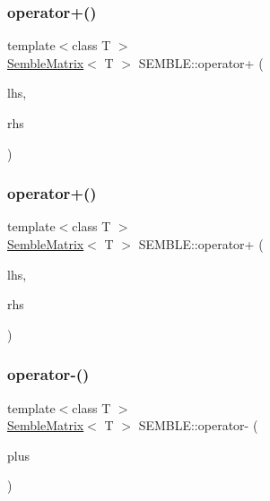 \mbox{\label{namespaceSEMBLE_a05f06146faa9f8202e65c4b5ea54b008}} 
\subsubsection{\texorpdfstring{operator+()}{operator+()}\hspace{0.1cm}{\footnotesize\ttfamily [5/6]}}
{\footnotesize\ttfamily template$<$class T $>$ \\
\mbox{\hyperlink{structSEMBLE_1_1SembleMatrix}{Semble\+Matrix}}$<$ T $>$ S\+E\+M\+B\+L\+E\+::operator+ (\begin{DoxyParamCaption}\item[{const \mbox{\hyperlink{structSEMBLE_1_1SembleMatrix}{Semble\+Matrix}}$<$ T $>$ \&}]{lhs,  }\item[{const itpp\+::\+Mat$<$ T $>$ \&}]{rhs }\end{DoxyParamCaption})}

\mbox{\label{namespaceSEMBLE_a4ca19eff646265f8adc603e9412f2827}} 
\subsubsection{\texorpdfstring{operator+()}{operator+()}\hspace{0.1cm}{\footnotesize\ttfamily [6/6]}}
{\footnotesize\ttfamily template$<$class T $>$ \\
\mbox{\hyperlink{structSEMBLE_1_1SembleMatrix}{Semble\+Matrix}}$<$ T $>$ S\+E\+M\+B\+L\+E\+::operator+ (\begin{DoxyParamCaption}\item[{const itpp\+::\+Mat$<$ T $>$ \&}]{lhs,  }\item[{const \mbox{\hyperlink{structSEMBLE_1_1SembleMatrix}{Semble\+Matrix}}$<$ T $>$ \&}]{rhs }\end{DoxyParamCaption})}

\mbox{\label{namespaceSEMBLE_a16e3604600dcf914788dc4f0d92a2fe7}} 
\subsubsection{\texorpdfstring{operator-\/()}{operator-()}\hspace{0.1cm}{\footnotesize\ttfamily [1/8]}}
{\footnotesize\ttfamily template$<$class T $>$ \\
\mbox{\hyperlink{structSEMBLE_1_1SembleMatrix}{Semble\+Matrix}}$<$ T $>$ S\+E\+M\+B\+L\+E\+::operator-\/ (\begin{DoxyParamCaption}\item[{const \mbox{\hyperlink{structSEMBLE_1_1SembleMatrix}{Semble\+Matrix}}$<$ T $>$ \&}]{plus }\end{DoxyParamCaption})}

